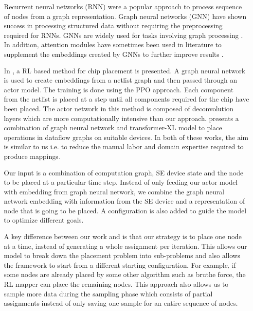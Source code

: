 Recurrent neural networks (RNN) \cite{hochreiter1996lstm} were a popular approach to process sequence of nodes from a graph representation. 
Graph neural networks (GNN) \cite{gori2005new} have shown success in processing structured data without requiring the preprocessing required for RNNs.
GNNs are widely used for tasks involving graph processing \cite{Zhou_compileGNN, zhou2019gdp}. 
In addition, attention modules have sometimes been used in literature to supplement the embeddings created by GNNs to further improve results \cite{addanki2019placeto}.

In \cite{mirhoseini2020chip}, a RL based method for chip placement is presented.
A graph neural network is used to create embeddings from a netlist graph and then passed through an actor model.
The training is done using the PPO approach.
Each component from the netlist is placed at a step until all components required for the chip have been placed.
The actor network in this method is composed of deconvolution layers which are more computationally intensive than our approach. 
\cite{zhou2019gdp} presents a combination of graph neural network and transformer-XL model to place operations in dataflow graphs on suitable devices.
In both of these works, the aim is similar to us i.e. to reduce the manual labor and domain expertise required to produce mappings.

Our input is a combination of computation graph, SE device state and the node to be placed at a particular time step. 
Instead of only feeding our actor model with embedding from graph neural network, we combine the graph neural network embedding with information from the SE device and a representation of node that is going to be placed. 
A configuration is also added to guide the model to optimize different goals.

A key difference between our work and \cite{zhou2019gdp} is that our strategy is to place one node at a time, instead of generating a whole assignment per iteration. 
This allows our model to break down the placement problem into sub-problems and also allows the framework to start from a different starting configuration. For example, if some nodes are already placed by some other algorithm such as bruthe force, the RL mapper can place the remaining nodes. 
This approach also allows us to sample more data during the sampling phase which consists of partial assignments instead of only saving one sample for an entire sequence of nodes.  